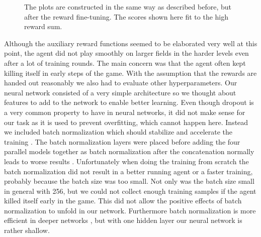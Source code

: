 \begin{figure}[H]
\begin{minipage}{0.49\textwidth}
	\end{minipage}
	\caption{The plots are constructed in the same way as described before, but after the reward fine-tuning. The scores shown here fit to the high reward sum.}
	\label{fig:efficientCoinHeaven}
\end{figure}

Although the auxiliary reward functions seemed to be elaborated very well at this point, the agent did not play smoothly on larger fields in the harder levels even after a lot of training rounds. The main concern was that the agent often kept killing itself in early steps of the game. With the assumption that the rewards are handed out reasonably we also had to evaluate other hyperparameters. Our neural network consisted of a very simple architecture so we thought about features to add to the network to enable better learning. Even though dropout is a very common property to have in neural networks, it did not make sense for our task as it is used to prevent overfitting, which cannot happen here. Instead we included batch normalization which should stabilize and accelerate the training \cite{batchnorm}. The batch normalization layers were placed before adding the four parallel models together as batch normalization after the concatenation normally leads to worse results \cite{batchnormpos}. Unfortunately when doing the training from scratch the batch normalization did not result in a better running agent or a faster training, probably because the batch size was too small. Not only was the batch size small in general with 256, but we could not collect enough training samples if the agent killed itself early in the game. This did not allow the positive effects of batch normalization to unfold in our network. Furthermore batch normalization is more efficient in deeper networks \cite{batchnorm}, but with one hidden layer our neural network is rather shallow.


